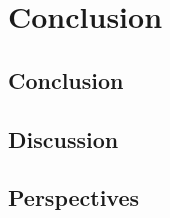 \chapter{Conclusion}
\minitoc
\lipsum

\section{Conclusion}
\lipsum
\section{Discussion}
\lipsum
\section{Perspectives}
\lipsum